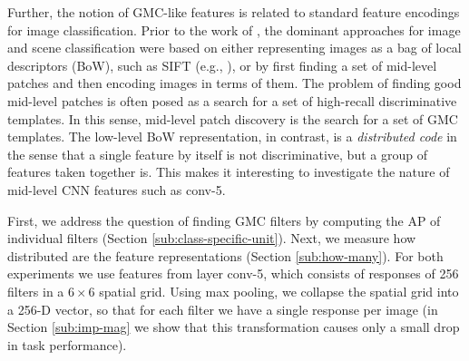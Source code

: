 Further, the notion of GMC-like features is related to standard feature encodings for image classification.
Prior to the work of \cite{Kriz}, the dominant approaches for image and scene classification were based on either representing images as a bag of local descriptors (BoW), such as SIFT (e.g., \cite{lazebnik2006beyond}), or by first finding a set of mid-level patches \cite{Blocks,Mid1} and then encoding images in terms of them. 
The problem of finding good mid-level patches is often posed as a search for a set of high-recall discriminative templates. 
In this sense, mid-level patch discovery is the search for a set of GMC templates. 
The low-level BoW representation, in contrast, is a \emph{distributed code} in the sense that a single feature by itself is not discriminative, but a group of features taken together is.
This makes it interesting to investigate the nature of mid-level CNN features such as conv-5. 

First, we address the question of finding GMC filters by computing the AP of individual filters (Section \ref{sub:class-specific-unit}). Next, we measure how distributed are the feature representations (Section \ref{sub:how-many}). For both experiments we use features from layer conv-5, which consists of responses of 256 filters in a $6\times 6$ spatial grid. Using max pooling, we collapse the spatial grid into a 256-D vector, so that for each filter we have a single response per image (in Section \ref{sub:imp-mag} we show that this transformation causes only a small drop in task performance).


